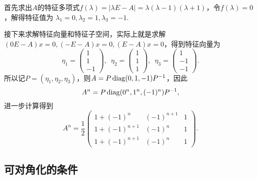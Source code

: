 \begin{solution}
    首先求出$A$的特征多项式$f(\lambda)=|\lambda E-A|=\lambda(\lambda-1)(\lambda+1)$，令$f(\lambda)=0$，解得特征值为 $\lambda_1=0,\lambda_2=1,\lambda_3=-1$.

    接下来求解特征向量和特征子空间，实际上就是求解$(0E-A)x=0,(-E-A)x=0,(E-A)x=0$，得到特征向量为
    \[\eta_1=\begin{pmatrix}
            1 \\ 1 \\ -1
        \end{pmatrix},\enspace \eta_2=\begin{pmatrix}
            1 \\ 1 \\ 1
        \end{pmatrix},\enspace \eta_3=\begin{pmatrix}
            1 \\ -1 \\ -1
        \end{pmatrix}.\]
    所以记$P=(\eta_1,\eta_2,\eta_3)$，则$A=P\operatorname{diag}(0,1,-1)P^{-1}$，因此
    \[A^n=P\operatorname{diag}(0^n,1^n,(-1)^n)P^{-1},\]
    进一步计算得到
    \[A^n=\frac{1}{2}\begin{pmatrix}
            1+(-1)^n     & (-1)^{n+1} & 1 \\
            1+(-1)^{n+1} & (-1)^n     & 1 \\
            1+(-1)^{n+1} & (-1)^n     & 1
        \end{pmatrix}.\]
\end{solution}

\subsection{可对角化的条件}


